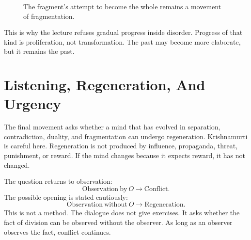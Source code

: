 \begin{figure}
\centering
{}
\caption{The fragment's attempt to become the whole remains a movement of fragmentation.}
\end{figure}

This is why the lecture refuses gradual progress inside disorder. Progress of that kind is proliferation, not transformation. The past may become more elaborate, but it remains the past.

\section{Listening, Regeneration, And Urgency}

The final movement asks whether a mind that has evolved in separation, contradiction, duality, and fragmentation can undergo regeneration. Krishnamurti is careful here. Regeneration is not produced by influence, propaganda, threat, punishment, or reward. If the mind changes because it expects reward, it has not changed.

The question returns to observation:
\begin{equation}
\mathrm{Observation\ by\ } O
\longrightarrow
\mathrm{Conflict}.
\end{equation}
The possible opening is stated cautiously:
\begin{equation}
\mathrm{Observation\ without\ } O
\longrightarrow
\mathrm{Regeneration}.
\end{equation}
This is not a method. The dialogue does not give exercises. It asks whether the fact of division can be observed without the observer. As long as an observer observes the fact, conflict continues.

